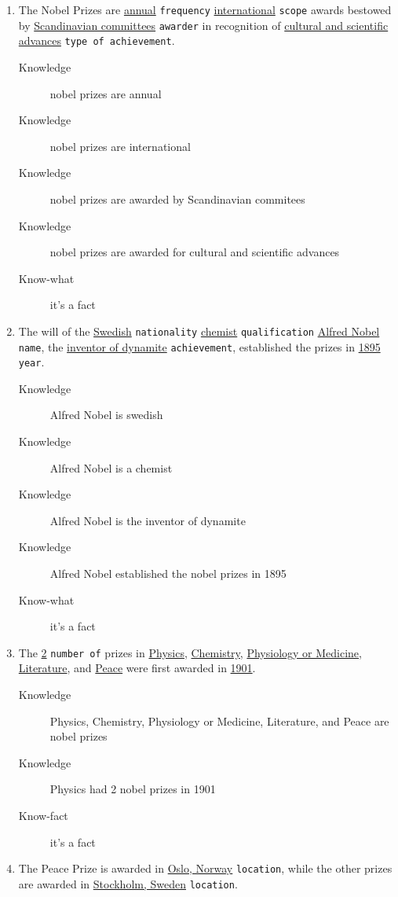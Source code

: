 \documentclass[a4paper,10pt,twoside,twocolumn]{article}
\begin{document}
\begin{enumerate}
\item The Nobel Prizes are \uline{annual} \texttt{frequency} \uline{international} \texttt{scope} awards bestowed by \uline{Scandinavian committees} \texttt{awarder} in recognition of \uline{cultural and scientific advances} \texttt{type of achievement}.
\begin{description}
\item[{Knowledge}] nobel prizes are annual
\item[{Knowledge}] nobel prizes are international
\item[{Knowledge}] nobel prizes are awarded by Scandinavian commitees
\item[{Knowledge}] nobel prizes are awarded for cultural and scientific advances
\item[{Know-what}] it's a fact
\end{description}
\item The will of the \uline{Swedish} \texttt{nationality} \uline{chemist} \texttt{qualification} \uline{Alfred Nobel} \texttt{name}, the \uline{inventor of dynamite} \texttt{achievement}, established the prizes in \uline{1895} \texttt{year}.
\begin{description}
\item[{Knowledge}] Alfred Nobel is swedish
\item[{Knowledge}] Alfred Nobel is a chemist
\item[{Knowledge}] Alfred Nobel is the inventor of dynamite
\item[{Knowledge}] Alfred Nobel established the nobel prizes in 1895
\item[{Know-what}] it's a fact
\end{description}
\item The \uline{2} \texttt{number of} prizes in \uline{Physics}, \uline{Chemistry}, \uline{Physiology or Medicine}, \uline{Literature}, and \uline{Peace} were first awarded in \uline{1901}.
\begin{description}
\item[{Knowledge}] Physics, Chemistry, Physiology or Medicine, Literature, and Peace are nobel prizes
\item[{Knowledge}] Physics had 2 nobel prizes in 1901
\item[{Know-fact}] it's a fact
\end{description}
\item The Peace Prize is awarded in \uline{Oslo, Norway} \texttt{location}, while the other prizes are awarded in \uline{Stockholm, Sweden} \texttt{location}.

\end{enumerate}
\end{document}
